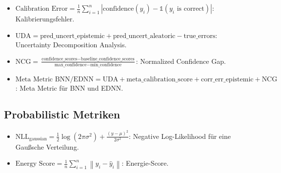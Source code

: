 \documentclass[headsepline,footsepline,footinclude=false,oneside,fontsize=11pt,paper=a4,listof=totoc,bibliography=totoc]{scrbook} %
\begin{document}
\begin{itemize}
  \item \( \text{Calibration Error} = \frac{1}{n} \sum_{i=1}^{n} \left| \text{confidence}(y_i) - \mathbb{1}(y_i \text{ is correct}) \right| \): Kalibrierungsfehler.
  \item \( \text{UDA} = \text{pred\_uncert\_epistemic} + \text{pred\_uncert\_aleatoric} - \text{true\_errors} \): Uncertainty Decomposition Analysis.
  \item \( \text{NCG} = \frac{\text{confidence\_scores} - \text{baseline\_confidence\_scores}}{\text{max\_confidence} - \text{min\_confidence}} \): Normalized Confidence Gap.
  \item \( \text{Meta Metric BNN/EDNN} = \text{UDA} + \text{meta\_calibration\_score} + \text{corr\_err\_epistemic} + \text{NCG} \): Meta Metric für BNN und EDNN.
\end{itemize}

\subsection*{Probabilistic Metriken}
\begin{itemize}
  \item \( \text{NLL}_{\text{gaussian}} = \frac{1}{2} \log(2 \pi \sigma^2) + \frac{(y - \mu)^2}{2 \sigma^2} \): Negative Log-Likelihood für eine Gaußsche Verteilung.
  \item \( \text{Energy Score} = \frac{1}{n} \sum_{i=1}^{n} \left\| y_i - \hat{y}_i \right\| \): Energie-Score.
\end{itemize}
\end{document}
